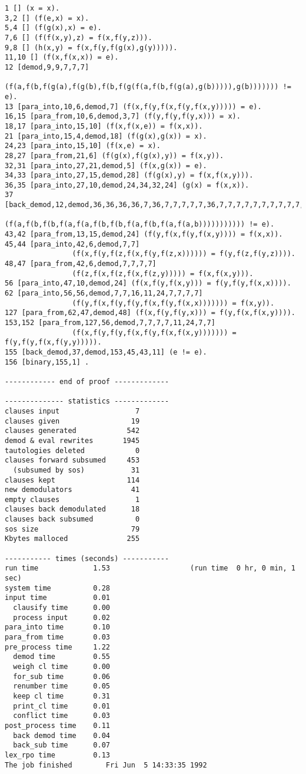 {\begin{verbatim}
1 [] (x = x).
3,2 [] (f(e,x) = x).
5,4 [] (f(g(x),x) = e).
7,6 [] (f(f(x,y),z) = f(x,f(y,z))).
9,8 [] (h(x,y) = f(x,f(y,f(g(x),g(y))))).
11,10 [] (f(x,f(x,x)) = e).
12 [demod,9,9,7,7,7] 
		(f(a,f(b,f(g(a),f(g(b),f(b,f(g(f(a,f(b,f(g(a),g(b))))),g(b))))))) != e).
13 [para_into,10,6,demod,7] (f(x,f(y,f(x,f(y,f(x,y))))) = e).
16,15 [para_from,10,6,demod,3,7] (f(y,f(y,f(y,x))) = x).
18,17 [para_into,15,10] (f(x,f(x,e)) = f(x,x)).
21 [para_into,15,4,demod,18] (f(g(x),g(x)) = x).
24,23 [para_into,15,10] (f(x,e) = x).
28,27 [para_from,21,6] (f(g(x),f(g(x),y)) = f(x,y)).
32,31 [para_into,27,21,demod,5] (f(x,g(x)) = e).
34,33 [para_into,27,15,demod,28] (f(g(x),y) = f(x,f(x,y))).
36,35 [para_into,27,10,demod,24,34,32,24] (g(x) = f(x,x)).
37 [back_demod,12,demod,36,36,36,36,7,36,7,7,7,7,7,36,7,7,7,7,7,7,7,7,7,7,7,11,24,7,16,7,16] 
                (f(a,f(b,f(b,f(a,f(a,f(b,f(b,f(a,f(b,f(a,f(a,b))))))))))) != e).
43,42 [para_from,13,15,demod,24] (f(y,f(x,f(y,f(x,y)))) = f(x,x)).
45,44 [para_into,42,6,demod,7,7] 
                (f(x,f(y,f(z,f(x,f(y,f(z,x)))))) = f(y,f(z,f(y,z)))).
48,47 [para_from,42,6,demod,7,7,7,7]
                (f(z,f(x,f(z,f(x,f(z,y))))) = f(x,f(x,y))).
56 [para_into,47,10,demod,24] (f(x,f(y,f(x,y))) = f(y,f(y,f(x,x)))).
62 [para_into,56,56,demod,7,7,16,11,24,7,7,7,7]
                (f(y,f(x,f(y,f(y,f(x,f(y,f(x,x))))))) = f(x,y)).
127 [para_from,62,47,demod,48] (f(x,f(y,f(y,x))) = f(y,f(x,f(x,y)))).
153,152 [para_from,127,56,demod,7,7,7,7,11,24,7,7]
                (f(x,f(y,f(y,f(x,f(y,f(x,f(x,y))))))) = f(y,f(y,f(x,f(y,y))))).
155 [back_demod,37,demod,153,45,43,11] (e != e).
156 [binary,155,1] .

------------ end of proof -------------

-------------- statistics -------------
clauses input                  7
clauses given                 19
clauses generated            542
demod & eval rewrites       1945
tautologies deleted            0
clauses forward subsumed     453
  (subsumed by sos)           31
clauses kept                 114
new demodulators              41
empty clauses                  1
clauses back demodulated      18
clauses back subsumed          0
sos size                      79
Kbytes malloced              255

----------- times (seconds) -----------
run time             1.53                   (run time  0 hr, 0 min, 1 sec)
system time          0.28
input time           0.01
  clausify time      0.00
  process input      0.02
para_into time       0.10
para_from time       0.03
pre_process time     1.22
  demod time         0.55
  weigh cl time      0.00
  for_sub time       0.06
  renumber time      0.05
  keep cl time       0.31
  print_cl time      0.01
  conflict time      0.03
post_process time    0.11
  back demod time    0.04
  back_sub time      0.07
lex_rpo time         0.13
The job finished        Fri Jun  5 14:33:35 1992
\end{verbatim} }
